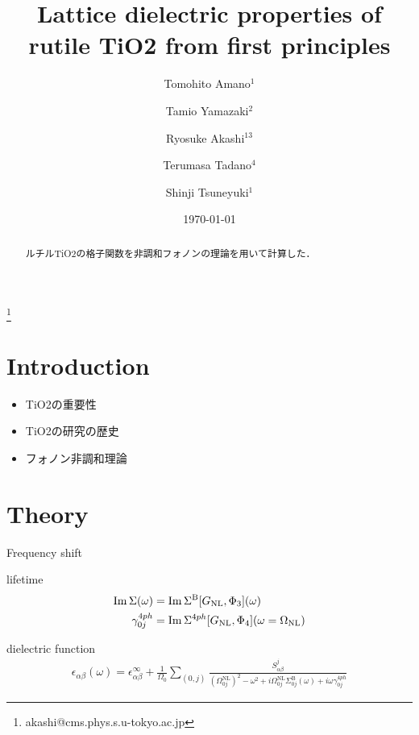 \documentclass[twocolumn,showpacs,prb,amsfonts,amsmath,amssymb,floatfix,groupedaddress]{revtex4-1}
\begin{document}
\title{Lattice dielectric properties of rutile TiO2 from first principles}
\author{Tomohito Amano$^{1}$ }
\author{Tamio Yamazaki$^{2}$ }
\author{Ryosuke Akashi$^{13}$ }
\author{Terumasa Tadano$^{4}$ }
\author{Shinji Tsuneyuki$^{1}$ }
\thanks{akashi@cms.phys.s.u-tokyo.ac.jp}





\date{\today}
\begin{abstract}
ルチルTiO2の格子関数を非調和フォノンの理論を用いて計算した．
\end{abstract}

\maketitle

\section{Introduction}
\begin{itemize}
 \item TiO2の重要性
 \item TiO2の研究の歴史
 \item フォノン非調和理論
\end{itemize}

\section{Theory}



Frequency shift

lifetime
\begin{align}
 \Im \Sigma(\omega) &=\Im \Sigma^{\mathrm{B}}[G_{\rm{NL}},\Phi_3](\omega)  \\
 \gamma^{4ph}_{0j}  &= \Im \Sigma^{4ph}[G_{\rm{NL}},\Phi_4](\omega=\Omega_{\rm{NL}})
\end{align}


dielectric function
\begin{align}
 \epsilon_{\alpha\beta}(\omega)=\epsilon^{\infty}_{\alpha\beta}+\frac{1}{\Omega_0}\sum_{(0,j)}\frac{S^{j}_{\alpha\beta}}{\left(\Omega^{\mathrm{NL}}_{0j}\right)^2-\omega^2+i\Omega^{\mathrm{NL}}_{0j} \Sigma^{\mathrm{B}}_{0j}(\omega)+i \omega \gamma^{4ph}_{0j} }
\end{align}
\end{document}
